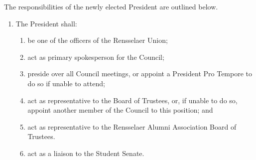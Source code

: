 \vspace{1em}

\noindent The responsibilities of the newly elected President are outlined below.
\begin{enumerate}
  \item The President shall:
  \begin{enumerate}
  \item be one of the officers of the Rensselaer Union;
  \item act as primary spokesperson for the Council;
  \item preside over all Council meetings, or appoint a President Pro Tempore to do so if unable to attend;
  \item act as representative to the Board of Trustees, or, if unable to do so, appoint another member of the Council to this position; and
  \item act as representative to the Rensselaer Alumni Association Board of Trustees.
  \item act as a liaison to the Student Senate.
  \end{enumerate}
\end{enumerate}


